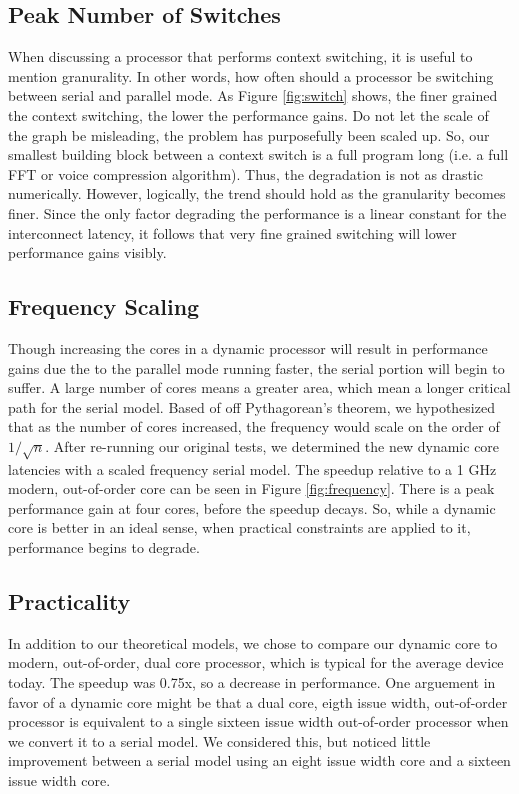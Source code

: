 \subsection{Peak Number of Switches}
When discussing a processor that performs context switching, it is useful to mention granurality. In other words, how often should a processor be switching between serial and parallel mode. As Figure \ref{fig:switch} shows, the finer grained the context switching, the lower the performance gains. Do not let the scale of the graph be misleading, the problem has purposefully been scaled up. So, our smallest building block between a context switch is a full program long (i.e. a full FFT or voice compression algorithm). Thus, the degradation is not as drastic numerically. However, logically, the trend should hold as the granularity becomes finer. Since the only factor degrading the performance is a linear constant for the interconnect latency, it follows that very fine grained switching will lower performance gains visibly.

\subsection{Frequency Scaling}
Though increasing the cores in a dynamic processor will result in performance gains due the to the parallel mode running faster, the serial portion will begin to suffer. A large number of cores means a greater area, which mean a longer critical path for the serial model. Based of off Pythagorean's theorem, we hypothesized that as the number of cores increased, the frequency would scale on the order of $1 / \sqrt{n}$. After re-running our original tests, we determined the new dynamic core latencies with a scaled frequency serial model. The speedup relative to a 1 GHz modern, out-of-order core can be seen in Figure \ref{fig:frequency}. There is a peak performance gain at four cores, before the speedup decays. So, while a dynamic core is better in an ideal sense, when practical constraints are applied to it, performance begins to degrade.

\subsection{Practicality}
In addition to our theoretical models, we chose to compare our dynamic core to modern, out-of-order, dual core processor, which is typical for the average device today. The speedup was 0.75x, so a decrease in performance. One arguement in favor of a dynamic core might be that a dual core, eigth issue width, out-of-order processor is equivalent to a single sixteen issue width out-of-order processor when we convert it to a serial model. We considered this, but noticed little improvement between a serial model using an eight issue width core and a sixteen issue width core.